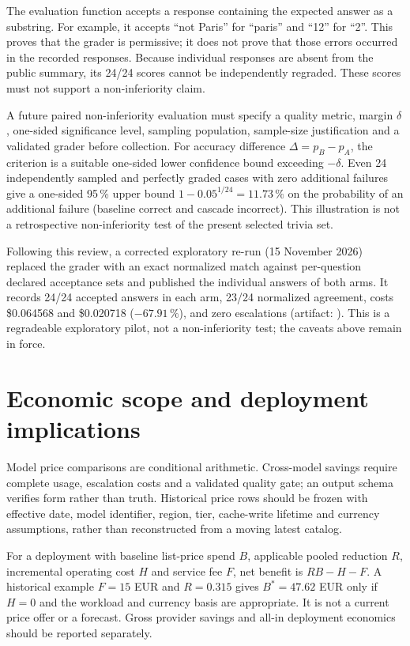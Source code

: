 \documentclass[11pt,a4paper]{article}
\begin{document}
The evaluation function accepts a response containing the expected answer as a substring. For
example, it accepts ``not Paris'' for ``paris'' and ``12'' for ``2''. This proves that the grader
is permissive; it does not prove that those errors occurred in the recorded responses. Because
individual responses are absent from the public summary, its 24/24 scores cannot be independently
regraded. These scores must not support a non-inferiority claim.

A future paired non-inferiority evaluation must specify a quality metric, margin $\delta$,
one-sided significance level, sampling population, sample-size justification and a validated
grader before collection. For accuracy difference $\Delta=p_B-p_A$, the criterion is a suitable
one-sided lower confidence bound exceeding $-\delta$. Even 24 independently sampled and
perfectly graded cases with zero additional failures give a one-sided 95\,\% upper bound
$1-0.05^{1/24}=11.73\,\%$ on the probability of an additional failure (baseline correct and
cascade incorrect). This illustration is not a retrospective non-inferiority test of the present
selected trivia set.

Following this review, a corrected exploratory re-run (15 November 2026) replaced the grader
with an exact normalized match against per-question declared acceptance sets and published the
individual answers of both arms. It records 24/24 accepted answers in each arm, 23/24 normalized
agreement, costs \$0.064568 and \$0.020718 ($-67.91\,\%$), and zero escalations (artifact:
). This is a regradeable
exploratory pilot, not a non-inferiority test; the caveats above remain in force.

\section{Economic scope and deployment implications}\label{sec:economia}
Model price comparisons are conditional arithmetic. Cross-model savings require complete usage,
escalation costs and a validated quality gate; an output schema verifies form rather than truth.
Historical price rows should be frozen with effective date, model identifier, region, tier,
cache-write lifetime and currency assumptions, rather than reconstructed from a moving latest
catalog.

For a deployment with baseline list-price spend $B$, applicable pooled reduction $R$, incremental
operating cost $H$ and service fee $F$, net benefit is $RB-H-F$. A historical example
$F=15$ EUR and $R=0.315$ gives $B^{*}=47.62$ EUR only if $H=0$ and the workload and currency
basis are appropriate. It is not a current price offer or a forecast. Gross provider savings and
all-in deployment economics should be reported separately.
\end{document}
